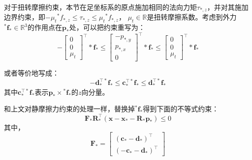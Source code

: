 对于扭转摩擦约束，本节在足坐标系的原点施加相同的法向力矩$\tau_{*, z}$，并对其施加边界约束，即$-\mu_t{ }^* f_{*, z} \leq \tau_{*, z} \leq \mu_t{ }^* f_{*, z}$，
$\mu_t \in \mathbb{R}$是扭转摩擦系数。考虑到外力${ }^* \boldsymbol{f}_* \in \mathbb{R}^{3}$的作用点在$\boldsymbol{p}_*$处，可以把约束重写为：
\begin{equation}
    \label{equ:friction_final}
    -\left[\begin{array}{c}
        0 \\
        0 \\
        \mu_t
        \end{array}\right]^{\top} * \boldsymbol{f}_* \leq\left[\begin{array}{c}
        -p_{*, y} \\
        p_{*, x} \\
        0
        \end{array}\right]^{\top} * \boldsymbol{f}_* \leq\left[\begin{array}{c}
        0 \\
        0 \\
        \mu_t
        \end{array}\right]^{\top} * \boldsymbol{f}_*
\end{equation}

或者等价地写成：
\begin{equation}
    \label{equ:friction_vector}
    -\boldsymbol{d}_*^{\top *} \boldsymbol{f}_* \leq \boldsymbol{c}_*^{\top *} \boldsymbol{f}_* \leq \boldsymbol{d}_*^{\top *} \boldsymbol{f}_*
\end{equation}
其中$\boldsymbol{c}_*^{\top *} \boldsymbol{f}_*$表示$\boldsymbol{p}_* \times { }^* \boldsymbol{f}_*$的$z$向分量。

和上文对静摩擦力约束的处理一样，替换掉${ }^* \boldsymbol{f}_*$得到下面的不等式约束：
\begin{equation}
    \label{equ:friction_stack}
    \boldsymbol{F}_* \boldsymbol{R}_*^{\top}\left(\boldsymbol{x}-\boldsymbol{x}_*-\boldsymbol{R}_* \boldsymbol{p}_*\right) \leq 0
\end{equation}
其中，
\begin{equation}
    \label{equ:friction_F}
    \boldsymbol{F}_*=\left[\begin{array}{c}
        \left(\boldsymbol{c}_*-\boldsymbol{d}_*\right)^{\top} \\
        \left(-\boldsymbol{c}_*-\boldsymbol{d}_*\right)^{\top}
        \end{array}\right]
\end{equation}


